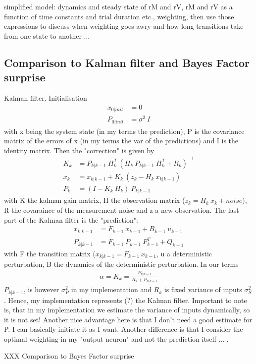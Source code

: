 \documentclass[10pt,a4paper,draft]{article}
\begin{document}
simplified model: dynamics and steady state of rM and rV, rM and rV as a function of time constants and trial duration etc., weighting, then use those expressions to discuss when weighting goes awry and how long transitions take from one state to another ...


\subsection*{Comparison to Kalman filter and Bayes Factor surprise}
%
Kalman filter. Initialisation
%
\begin{align*}
x_{0|init} &= 0 \\
P_{0|init} &= \sigma^2\ I
\end{align*}
%
with x being the system state (in my terms the prediction), P is the covariance matrix of the errors of x (in my terms the var of the predictions) and I is the identity matrix.
%
Then the "correction" is given by
%
\begin{align*}
K_k &= P_{k|k-1}\ H_k^T\ \left( H_k\ P_{k|k-1}\ H_k^T + R_k \right)^{-1} \\
x_k &= x_{k|k-1} + K_k\ \left( z_k - H_k\ x_{k|k-1}\right) \\
P_k &= \left( I - K_k\ H_k\right)\ P_{k|k-1}
\end{align*}
%
with K the kalman gain matrix, H the observation matrix ($z_k = H_k\ x_k + noise$), R the covaraince of the measurement noise and z a new observation. The last part of the Kalman filter is the "prediction":
%
\begin{align*}
x_{k|k-1} &= F_{k-1}\ x_{k-1} + B_{k-1}\ u_{k-1} \\
P_{k|k-1} &= F_{k-1}\ P_{k-1}\ F_{k-1}^T + Q_{k-1}
\end{align*}
%
with F the transition matrix ($x_{k|k-1} = F_{k-1}\ x_{k-1}$, u a deterministic perturbation, B the dynamics of the deterministic perturbation. In our terms
%
\begin{align*}
\alpha = K_k = \frac{P_{k|k-1}}{R_k + P_{k|k-1}}
\end{align*}
%
$P_{k|k-1}$, is however $\sigma_P^2$ in my implementation and $R_k$ is fixed variance of inputs $\sigma_S^2$. Hence, my implementation represents (?) the Kalman filter. Important to note is, that in my implementation we estimate the variance of inputs dynamically, so it is not set! Another nice advantage here is that I don't need a good estimate for P. I can basically initiate it as I want. Another difference is that I consider the optimal weighting in my "output neuron" and not the prediction itself ... .

XXX Comparison to Bayes Factor surprise
\end{document}
